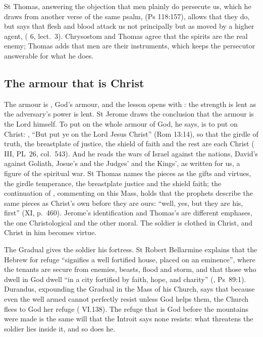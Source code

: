 St Thomas, answering the objection that men plainly do persecute us, which he
draws from another verse of the same psalm, 
(Ps 118:157), allows that they do, but says that flesh and blood attack us not
principally but as moved by a higher agent,  ( 6, lect.~3). Chrysostom and Thomas
agree that the spirits are the real enemy; Thomas adds that men are their
instruments, which keeps the persecutor answerable for what he does.

\subsection{The armour that is Christ}

The armour is , God's armour, and the lesson opens with
: the strength is
lent as the adversary's power is lent. St Jerome draws the conclusion that the
armour is the Lord himself. To put on the whole armour of God, he says, is to put
on Christ: , ``But put ye on
the Lord Jesus Christ'' (Rom 13:14), so that the girdle of truth, the breastplate
of justice, the shield of faith and the rest are each Christ (
III, PL~26, col.~543). And he reads the wars of Israel against the nations,
David's against Goliath, Josue's and the Judges' and the Kings', as written for
us, a figure of the spiritual war. St Thomas names the pieces as the gifts and
virtues, the girdle temperance, the breastplate justice and the shield faith; the
continuation of , commenting on this Mass, holds that
the prophets describe the same pieces as Christ's own before they are ours:
``well, yes, but they are his, first'' (XI, p.~460). Jerome's identification
and Thomas's are different emphases, the one Christological and the other
moral. The soldier is clothed in Christ, and Christ in him becomes virtue.

The Gradual gives the soldier his fortress. St Robert Bellarmine explains that
the Hebrew for refuge ``signifies a well fortified house, placed on an
eminence'', where the tenants are secure from enemies, beasts, flood and storm,
and that those who dwell in God dwell ``in a city fortified by faith, hope, and
charity'' (, Ps~89:1). Durandus, expounding the
Gradual in the Mass of his Church, says that because even the well armed cannot
perfectly resist unless God helps them, the Church flees to God her refuge
( VI.138). The refuge that is God before the mountains
were made is the same will that the Introit says none resists: what threatens
the soldier lies inside it, and so does he.

